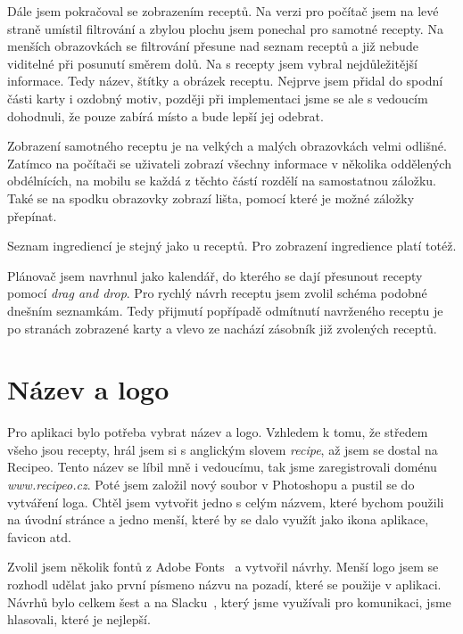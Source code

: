 Dále jsem pokračoval se zobrazením receptů. Na verzi pro počítač jsem na levé straně umístil filtrování a zbylou plochu jsem ponechal
pro samotné recepty. Na menších obrazovkách se filtrování přesune nad seznam receptů a již nebude viditelné při posunutí směrem dolů.
Na  s recepty jsem vybral nejdůležitější informace. Tedy název, štítky a obrázek receptu. Nejprve jsem přidal do spodní části
karty i ozdobný motiv, později při implementaci jsme se ale s vedoucím dohodnuli, že pouze zabírá místo a bude lepší jej odebrat.

Zobrazení samotného receptu je na velkých a malých obrazovkách velmi odlišné. Zatímco na počítači se uživateli zobrazí všechny
informace v několika oddělených obdélnících, na mobilu se každá z těchto částí rozdělí na samostatnou záložku. Také se na spodku
obrazovky zobrazí lišta, pomocí které je možné záložky přepínat.

Seznam ingrediencí je stejný jako u receptů. Pro zobrazení ingredience platí totéž.

Plánovač jsem navrhnul jako kalendář, do kterého se dají přesunout recepty pomocí \emph{drag and drop}. Pro rychlý návrh receptu
jsem zvolil schéma podobné dnešním seznamkám. Tedy přijmutí popřípadě odmítnutí navrženého receptu je po stranách zobrazené karty
a vlevo ze nachází zásobník již zvolených receptů.

\section{Název a logo}
Pro aplikaci bylo potřeba vybrat název a logo. Vzhledem k tomu, že středem všeho jsou recepty, hrál jsem si s anglickým slovem
\emph{recipe}, až jsem se dostal na Recipeo. Tento název se líbil mně i vedoucímu, tak jsme zaregistrovali doménu \emph{www.recipeo.cz}.
Poté jsem založil nový soubor v Photoshopu a pustil se do vytváření loga. Chtěl jsem vytvořit jedno s celým názvem, které bychom použili
na úvodní stránce a jedno menší, které by se dalo využít jako ikona aplikace, favicon atd.

Zvolil jsem několik fontů z Adobe Fonts~\cite{AdobeFonts} a vytvořil návrhy. Menší logo jsem se rozhodl udělat jako první písmeno názvu na pozadí,
které se použije v aplikaci. Návrhů bylo celkem šest a na Slacku~\cite{Slack}, který jsme využívali pro komunikaci, jsme hlasovali, které je nejlepší.

